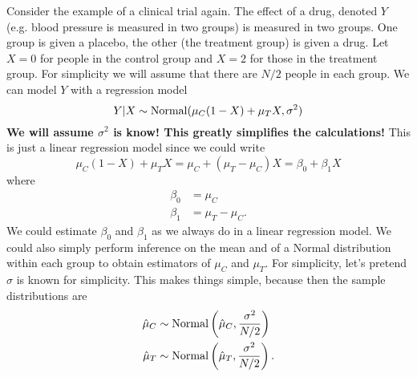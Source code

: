 \begin{example}
Consider the example of a clinical trial again. The effect of a drug, denoted $Y$ (e.g. blood pressure is measured in two groups) is measured in two groups.  One group is given a placebo, the other (the treatment group) is given a drug. Let $X=0$ for people in the control group and $X=2$ for those in the treatment group.   For simplicity we will assume that there are $N/2$ people in each group. We can model $Y$ with a regression model 
\begin{equation*}
Y|X \sim{\rm Normal}(\mu_C (1-X) + \mu_T X,\sigma^2)
\end{equation*}
{\bf We will assume $\sigma^2$ is know! This greatly simplifies the calculations!}
This is just a linear regression model since we could write
\begin{equation*}
\mu_C (1-X) + \mu_T X = \mu_C + (\mu_T-\mu_C)X = \beta_0 + \beta_1 X
\end{equation*}
where
\begin{align*}
\beta_0 &= \mu_C\\
\beta_1 &= \mu_T - \mu_C.
\end{align*}
We could estimate $\beta_0$ and $\beta_1$ as we always do in a linear regression model. We could also simply perform inference on the mean and of a Normal distribution within each group to obtain estimators of $\mu_C$ and $\mu_T$. For simplicity, let's pretend $\sigma$ is known for simplicity. This makes things simple, because then the sample distributions are 
 \begin{align*}
 \hat{\mu}_C &\sim {\rm Normal}\left(\hat{\mu}_C,\frac{\sigma^2}{N/2}\right)\\
  \hat{\mu}_T &\sim {\rm Normal}\left(\hat{\mu}_T,\frac{\sigma^2}{N/2}\right). 
 \end{align*}
 

\end{example}
